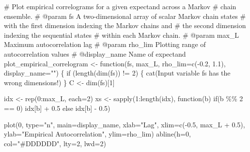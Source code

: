 \documentclass[
  letterpaper,
  DIV=11,
  numbers=noendperiod]{scrartcl}
\newenvironment{Shaded}{\begin{snugshade}}{\end{snugshade}}
\newcommand{\BuiltInTok}[1]{\textcolor[rgb]{0.00,0.23,0.31}{#1}}
\newcommand{\CommentTok}[1]{\textcolor[rgb]{0.37,0.37,0.37}{#1}}
\newcommand{\ControlFlowTok}[1]{\textcolor[rgb]{0.00,0.23,0.31}{#1}}
\newcommand{\DecValTok}[1]{\textcolor[rgb]{0.68,0.00,0.00}{#1}}
\newcommand{\FloatTok}[1]{\textcolor[rgb]{0.68,0.00,0.00}{#1}}
\newcommand{\NormalTok}[1]{\textcolor[rgb]{0.00,0.23,0.31}{#1}}
\newcommand{\OperatorTok}[1]{\textcolor[rgb]{0.37,0.37,0.37}{#1}}
\newcommand{\StringTok}[1]{\textcolor[rgb]{0.13,0.47,0.30}{#1}}
\begin{document}
\begin{Shaded}
\begin{Highlighting}[]
\CommentTok{\# Plot empirical correlograms for a given expectand across a Markov }
\CommentTok{\# chain ensemble.}
\CommentTok{\# @param fs A two{-}dimensional array of scalar Markov chain states }
\CommentTok{\#           with the first dimension indexing the Markov chains and }
\CommentTok{\#           the second dimension indexing the sequential states }
\CommentTok{\#           within each Markov chain.}
\CommentTok{\# @param max\_L Maximum autocorrelation lag}
\CommentTok{\# @param rho\_lim Plotting range of autocorrelation values}
\CommentTok{\# @display\_name Name of expectand}
\NormalTok{plot\_empirical\_correlogram }\OperatorTok{\textless{}{-}}\NormalTok{ function(fs,}
\NormalTok{                                       max\_L,}
\NormalTok{                                       rho\_lim}\OperatorTok{=}\NormalTok{c(}\OperatorTok{{-}}\FloatTok{0.2}\NormalTok{, }\FloatTok{1.1}\NormalTok{),}
\NormalTok{                                       display\_name}\OperatorTok{=}\StringTok{""}\NormalTok{) \{}
  \ControlFlowTok{if}\NormalTok{ (length(dim(fs)) }\OperatorTok{!=} \DecValTok{2}\NormalTok{) \{}
\NormalTok{    cat(}\StringTok{\textquotesingle{}Input variable \textasciigrave{}fs\textasciigrave{} has the wrong dimensions!\textquotesingle{}}\NormalTok{)}
\NormalTok{  \}}
\NormalTok{  C }\OperatorTok{\textless{}{-}}\NormalTok{ dim(fs)[}\DecValTok{1}\NormalTok{]}
  
\NormalTok{  idx }\OperatorTok{\textless{}{-}}\NormalTok{ rep(}\DecValTok{0}\NormalTok{:max\_L, each}\OperatorTok{=}\DecValTok{2}\NormalTok{)}
\NormalTok{  xs }\OperatorTok{\textless{}{-}}\NormalTok{ sapply(}\DecValTok{1}\NormalTok{:length(idx), function(b) }\ControlFlowTok{if}\NormalTok{(b }\OperatorTok{\%\%} \DecValTok{2} \OperatorTok{==} \DecValTok{0}\NormalTok{) idx[b] }\OperatorTok{+} \FloatTok{0.5}
                                          \ControlFlowTok{else}\NormalTok{ idx[b] }\OperatorTok{{-}} \FloatTok{0.5}\NormalTok{)}

\NormalTok{  plot(}\DecValTok{0}\NormalTok{, }\BuiltInTok{type}\OperatorTok{=}\StringTok{"n"}\NormalTok{, main}\OperatorTok{=}\NormalTok{display\_name,}
\NormalTok{       xlab}\OperatorTok{=}\StringTok{"Lag"}\NormalTok{, xlim}\OperatorTok{=}\NormalTok{c(}\OperatorTok{{-}}\FloatTok{0.5}\NormalTok{, max\_L }\OperatorTok{+} \FloatTok{0.5}\NormalTok{),}
\NormalTok{       ylab}\OperatorTok{=}\StringTok{"Empirical Autocorrelation"}\NormalTok{, ylim}\OperatorTok{=}\NormalTok{rho\_lim)}
\NormalTok{  abline(h}\OperatorTok{=}\DecValTok{0}\NormalTok{, col}\OperatorTok{=}\StringTok{"\#DDDDDD"}\NormalTok{, lty}\OperatorTok{=}\DecValTok{2}\NormalTok{, lwd}\OperatorTok{=}\DecValTok{2}\NormalTok{)}


\end{Highlighting}
\end{Shaded}
\end{document}
